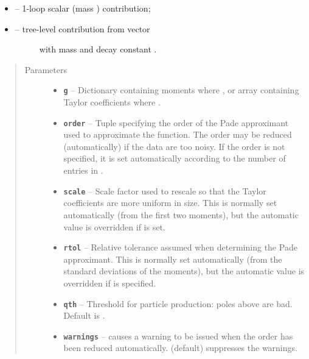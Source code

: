 \documentclass[letterpaper,10pt,english]{sphinxmanual}
\begin{document}
\begin{fulllineitems}
\begin{itemize}
\item {} 
 -- 1-loop scalar (mass ) contribution;

\item {} \begin{description}
\item[{ -- tree-level contribution from vector}] \leavevmode
with mass  and decay constant .

\end{description}

\end{itemize}
\begin{quote}\begin{description}
\item[{Parameters}] \leavevmode\begin{itemize}
\item {} 
\textbf{\texttt{g}} -- Dictionary containing moments where ,
or array containing Taylor coefficients where
.

\item {} 
\textbf{\texttt{order}} -- Tuple  specifying the order of the Pade
approximant used to approximate the function. The order may
be reduced (automatically) if the data are too noisy.
If the order is not specified, it is set automatically
according to the number of entries in .

\item {} 
\textbf{\texttt{scale}} -- Scale factor used to rescale  so that
the Taylor coefficients are more uniform in size. This is
normally set automatically (from the first two moments),
but the automatic value is overridden if  is set.

\item {} 
\textbf{\texttt{rtol}} -- Relative tolerance assumed when determining the
Pade approximant. This is normally set automatically
(from the standard deviations of the moments), but the
automatic value is overridden if  is specified.

\item {} 
\textbf{\texttt{qth}} -- Threshold for particle production: poles above 
are bad. Default is .

\item {} 
\textbf{\texttt{warnings}} --  causes a warning to be issued when the
order has been reduced automatically.  (default)
suppresses the warnings.


\end{itemize}
\end{description}
\end{quote}
\end{fulllineitems}
\end{document}
